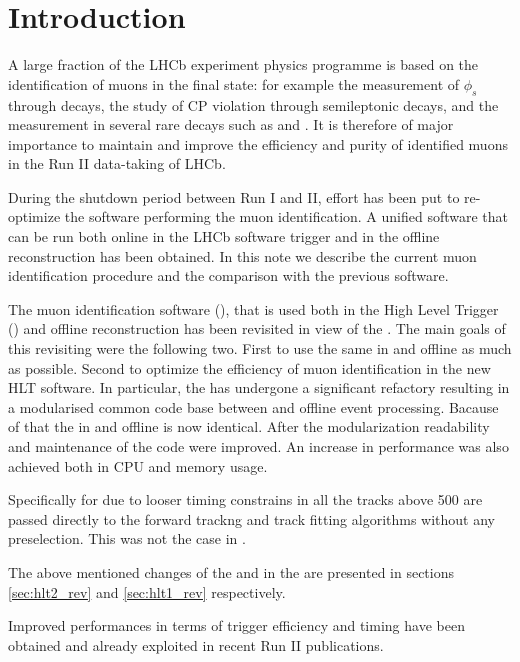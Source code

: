 
\section{Introduction}
\label{sec:Introduction}

A large fraction of the LHCb experiment physics programme is based on the identification of muons in the final state: for example
the measurement of $\phi_s$ through \BsJpsiPhi decays, the study of CP violation through semileptonic decays, and the measurement in several
rare decays such as \BdKstmumu and \Bsmm. 
It is therefore of major importance to maintain and improve the efficiency and purity of identified muons in the Run II data-taking of LHCb.

During the shutdown period between Run I and II, effort has been put to re-optimize the software performing the muon identification.
A unified software that can be run both online in the LHCb software trigger and in the offline reconstruction has been obtained.
In this note we describe the current muon identification procedure and the comparison with the previous software.

The muon identification software \cite{LHCb-PUB-2009-013,LHCb-PUB-2010-002} (\muonID),
that is used both in the High Level Trigger (\hlt) \cite{LHCb-PUB-2011-017} and offline reconstruction has been
revisited in view of the \lhc \runtwo.
The main goals of this revisiting were the following two. First to use the same \muonID in \hlt and offline as much as possible.
Second to optimize the efficiency of muon identification in the new HLT software.
In particular, the \muonID has undergone a significant refactory resulting in a modularised common code base
between \hlt and offline event processing.
Bacause of that the \muonID in \hlt and offline is now identical. After the modularization readability and maintenance
of the code were improved.  An increase in performance was also achieved both in CPU and memory usage.

Specifically for \hltone due to looser timing constrains in \runtwo all the tracks above 500 \mevc
are passed directly to the forward trackng and track fitting algorithms without any preselection. This was not the
case in \runone.

The above mentioned changes of the \muonID and in the \hltone are presented in sections \ref{sec:hlt2_rev} and \ref{sec:hlt1_rev} respectively.

Improved performances in terms of trigger efficiency and timing have been obtained and already exploited in recent Run II publications.
